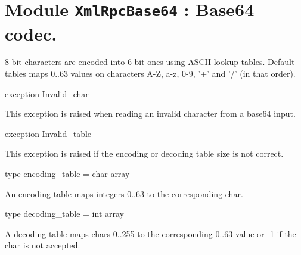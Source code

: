 \documentclass[11pt]{article}
\begin{document}
\tableofcontents
\section{Module {\tt{XmlRpcBase64}} : Base64 codec.}
\label{module:XmlRpcBase64}



	8-bit characters are encoded into 6-bit ones using ASCII lookup tables.
	Default tables maps 0..63 values on characters A-Z, a-z, 0-9, '+' and '/'
	(in that order).



\ocamldocvspace{0.5cm}



\label{exception:XmlRpcBase64.Invalid-underscorechar}\begin{ocamldoccode}
exception Invalid_char
\end{ocamldoccode}
\begin{ocamldocdescription}
This exception is raised when reading an invalid character
	from a base64 input.


\end{ocamldocdescription}




\label{exception:XmlRpcBase64.Invalid-underscoretable}\begin{ocamldoccode}
exception Invalid_table
\end{ocamldoccode}
\begin{ocamldocdescription}
This exception is raised if the encoding or decoding table
	size is not correct.


\end{ocamldocdescription}




\label{type:XmlRpcBase64.encoding-underscoretable}\begin{ocamldoccode}
type encoding_table = char array 
\end{ocamldoccode}
\begin{ocamldocdescription}
An encoding table maps integers 0..63 to the corresponding char.


\end{ocamldocdescription}




\label{type:XmlRpcBase64.decoding-underscoretable}\begin{ocamldoccode}
type decoding_table = int array 
\end{ocamldoccode}
\begin{ocamldocdescription}
A decoding table maps chars 0..255 to the corresponding 0..63 value
 or -1 if the char is not accepted.


\end{ocamldocdescription}
\end{document}
